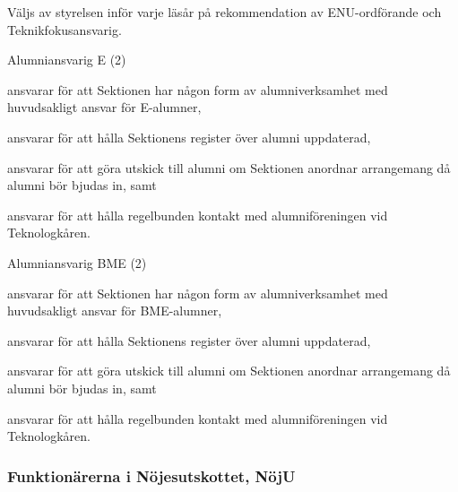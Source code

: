 \documentclass[10pt]{article}
\begin{document}
\begin{emptylist}
\begin{dashlist}
    			\item Väljs av styrelsen inför varje läsår på rekommendation av ENU-ordförande och Teknikfokusansvarig.
    		\end{dashlist}
        \item Alumniansvarig E (2)
            \begin{dashlist}
                \item ansvarar för att Sektionen har någon form av alumniverksamhet med huvudsakligt ansvar för E-alumner,
                \item ansvarar för att hålla Sektionens register över alumni uppdaterad,
                \item ansvarar för att göra utskick till alumni om Sektionen anordnar arrangemang då alumni bör bjudas in, samt
                \item  ansvarar för att hålla regelbunden kontakt med alumniföreningen vid Teknologkåren.
            \end{dashlist}
        \item Alumniansvarig BME (2)
            \begin{dashlist}
                \item ansvarar för att Sektionen har någon form av alumniverksamhet med huvudsakligt ansvar för BME-alumner,
                \item ansvarar för att hålla Sektionens register över alumni uppdaterad,
                \item ansvarar för att göra utskick till alumni om Sektionen anordnar arrangemang då alumni bör bjudas in, samt
                \item  ansvarar för att hålla regelbunden kontakt med alumniföreningen vid Teknologkåren.
            \end{dashlist}
\end{emptylist}

\subsubsection{Funktionärerna i Nöjesutskottet, NöjU}
\end{document}
